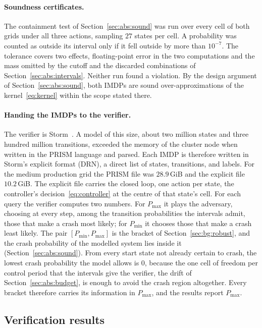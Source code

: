\documentclass[11pt,a4paper]{article}
\theoremstyle{plain}
\theoremstyle{remark}
\begin{document}
	\paragraph{Soundness certificates.}
	The containment test of Section~\ref{sec:abs:sound} was run over every cell of both grids under all three actions, sampling $27$ states per cell. A probability was counted as outside its interval only if it fell outside by more than $10^{-7}$. The tolerance covers two effects, floating-point error in the two computations and the mass omitted by the cutoff and the discarded combinations of Section~\ref{sec:abs:intervals}. Neither run found a violation. By the design argument of Section~\ref{sec:abs:sound}, both IMDPs are sound over-approximations of the kernel~\eqref{eq:kernel} within the scope stated there.
	
	\paragraph{Handing the IMDPs to the verifier.}
	The verifier is Storm~\cite{Storm}. A model of this size, about two million states and three hundred million transitions, exceeded the memory of the cluster node when written in the PRISM language and parsed. Each IMDP is therefore written in Storm's explicit format (DRN), a direct list of states, transitions, and labels. For the medium production grid the PRISM file was $28.9$\,GiB and the explicit file $10.2$\,GiB. The explicit file carries the closed loop, one action per state, the controller's decision~\eqref{eq:controller} at the centre of that state's cell. For each query the verifier computes two numbers. For $P_{\max}$ it plays the adversary, choosing at every step, among the transition probabilities the intervals admit, those that make a crash most likely; for $P_{\min}$ it chooses those that make a crash least likely. The pair $[P_{\min}, P_{\max}]$ is the bracket of Section~\ref{sec:bg:robust}, and the crash probability of the modelled system lies inside it (Section~\ref{sec:abs:sound}). From every start state not already certain to crash, the lowest crash probability the model allows is $0$, because the one cell of freedom per control period that the intervals give the verifier, the drift of Section~\ref{sec:abs:budget}, is enough to avoid the crash region altogether. Every bracket therefore carries its information in $P_{\max}$, and the results report $P_{\max}$.
	
	\subsection{Verification results}
	\label{sec:cs:ver}
	
\end{document}
